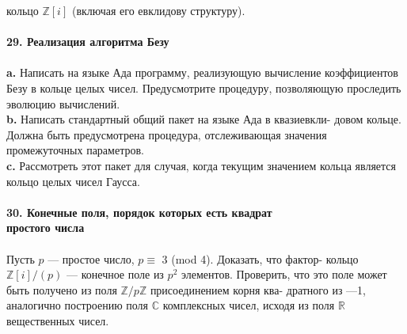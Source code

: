 \documentclass{mai_book}
\begin{document}
кольцо $\mathbb{Z}[i]$ (включая его евклидову структуру). \\
\\
\noindent\textbf{29. Реализация алгоритма Безу}\\\\
\hspace*{10pt}\textbf{a.} Написать на языке Ада программу, реализующую вычисление\linebreak
коэффициентов Безу в кольце целых чисел. Предусмотрите процедуру,\linebreak
позволяющую проследить эволюцию вычислений.\\
\hspace*{10pt}\textbf{b.} Написать стандартный общий пакет на языке Ада в квазиевкли-\linebreak
довом кольце. Должна быть предусмотрена процедура, отслеживающая\linebreak
значения промежуточных параметров. \\
\hspace*{10pt}\textbf{c.} Рассмотреть этот пакет для случая, когда текущим значением
кольца является кольцо целых чисел Гаусса.
\\
\\
\noindent\textbf{30. Конечные поля, порядок которых есть квадрат\\
простого числа}\\\\
\hspace*{10pt} Пусть $p$ — простое число, $p \equiv$ 3 (mod 4). Доказать, что фактор-\linebreak
кольцо $\mathbb{Z}[i]/(p)$ — конечное поле из $p^2$ элементов. Проверить, что это\linebreak
поле может быть получено из поля  $\mathbb{Z}/p\mathbb{Z}$ присоединением корня ква-\linebreak
дратного из —1, аналогично построению поля $\mathbb{C}$ комплексных чисел,\linebreak
исходя из поля $\mathbb{R}$ вещественных чисел.
\pagebreak

\end{document}
